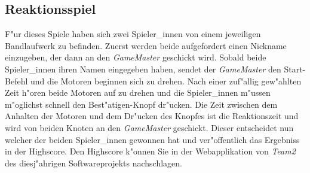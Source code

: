 \documentclass[a4paper]{article}
\begin{document}
  \subsection{Reaktionsspiel}
    \label{sec:retro11_game}
    F"ur dieses Spiele haben sich zwei Spieler\_innen von einem jeweiligen
    Bandlaufwerk zu befinden. Zuerst werden beide aufgefordert einen Nickname
    einzugeben, der dann an den \textit{GameMaster} geschickt wird. Sobald
    beide Spieler\_innen ihren Namen eingegeben haben, sendet der
    \textit{GameMaster} den Start-Befehl und die Motoren beginnen sich zu
    drehen. Nach einer zuf"allig gew"ahlten Zeit h"oren beide Motoren auf zu
    drehen und die Spieler\_innen m"ussen m"oglichst schnell den
    Best"atigen-Knopf dr"ucken. Die Zeit zwischen dem Anhalten der Motoren und
    dem Dr"ucken des Knopfes ist die Reaktionszeit und wird von beiden Knoten
    an den \textit{GameMaster} geschickt. Dieser entscheidet nun welcher der
    beiden Spieler\_innen gewonnen hat und ver"offentlich das Ergebniss in der
    Highscore. Den Highscore k"onnen Sie in der Webapplikation von
    \textit{Team2} des diesj"ahrigen Softwareprojekts nachschlagen.
\end{document}

